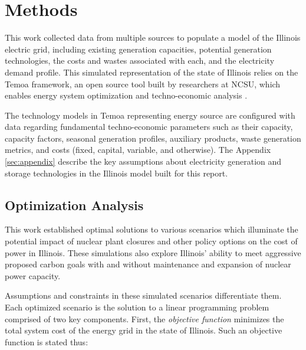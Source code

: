                        \section{Methods}\label{sec:methods}
This work collected data from multiple sources to populate a model of the 
Illinois electric grid, including existing generation capacities, potential 
generation technologies, the costs and wastes associated with each, and the 
electricity demand profile. This simulated representation of the state of 
Illinois relies on the Temoa framework, an open source tool built by 
researchers at \gls{NCSU}, which enables energy system optimization and 
techno-economic analysis 
\cite{decarolis_temoa_2010,decarolis_modelling_2016,decarolis_formalizing_2017}.

The technology models in Temoa representing energy source are configured with
data regarding fundamental techno-economic parameters such as their capacity,
capacity factors, seasonal generation profiles, auxiliary products, waste
generation metrics, and costs (fixed, capital, variable, and otherwise).
The Appendix \ref{sec:appendix} describe the key assumptions about electricity
generation and storage technologies in the Illinois model built for this
report.


\subsection{Optimization Analysis}
This work established optimal solutions to 
various scenarios which illuminate the potential impact of nuclear plant 
closures and other policy options on the cost of power in Illinois. These 
simulations  also explore Illinois' ability to meet aggressive proposed carbon 
goals with and without maintenance and expansion of nuclear power 
capacity. 

Assumptions and constraints in these simulated scenarios differentiate them. 
Each optimized scenario is the solution to a linear programming 
problem  comprised of two key components. First, the \emph{objective function}
minimizes the total system cost of the energy grid in the state of 
Illinois. 
Such an objective function is stated thus:

